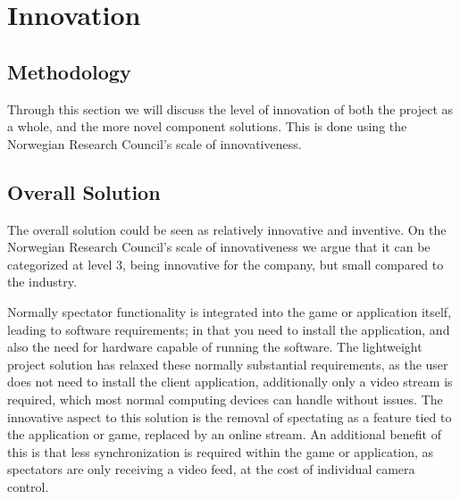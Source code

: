 \section{Innovation}

\subsection{Methodology}
Through this section we will discuss the level of innovation of both the project as a whole, and the more novel component solutions. This is done using the Norwegian Research Council's scale of innovativeness\cite{nrcs}.


\subsection{Overall Solution}
The overall solution could be seen as relatively innovative and inventive. On the Norwegian Research Council's\cite{nrcs} scale of innovativeness we argue that it can be categorized at level 3, being innovative for the company, but small compared to the industry.

Normally spectator functionality is integrated into the game or application itself, leading to software requirements; in that you need to install the application, and also the need for hardware capable of running the software. The lightweight project solution has relaxed these normally substantial requirements, as the user does not need to install the client application, additionally only a video stream is required, which most normal computing devices can handle without issues. The innovative aspect to this solution is the removal of spectating as a feature tied to the application or game, replaced by an online stream. An additional benefit of this is that less synchronization is required within the game or application, as spectators are only receiving a video feed, at the cost of individual camera control.

